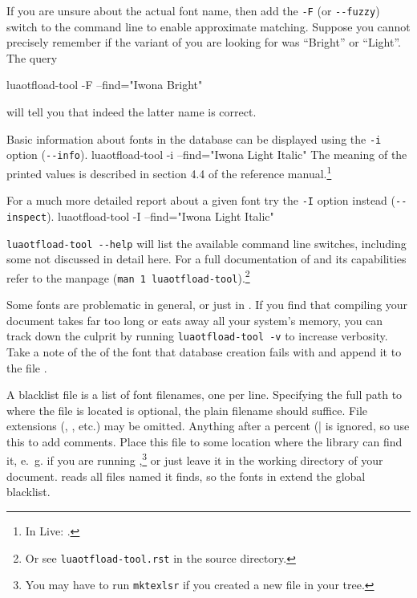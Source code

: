 If you are unsure about the actual font name, then add the
\verb|-F| (or \verb|--fuzzy|) switch to the command line to enable
approximate matching.
%
Suppose you cannot precisely remember if the variant of
 you are looking for was “Bright” or “Light”.
The query

\beginlisting
  luaotfload-tool  -F --find="Iwona Bright"
\endlisting

\noindent
will tell you that indeed the latter name is correct.

Basic information about fonts in the database can be displayed
using the \verb|-i| option (\verb|--info|).
%
\beginlisting
  luaotfload-tool  -i --find="Iwona Light Italic"
\endlisting
%
\noindent
The meaning of the printed values is described in section 4.4 of the
\LUATEX reference manual.\footnote{%
  In \TEX Live: .
}

For a much more detailed report about a given font try the \verb|-I| option
instead (\verb|--inspect|).
\beginlisting
  luaotfload-tool  -I --find="Iwona Light Italic"
\endlisting

\verb|luaotfload-tool --help| will list the available command line
switches, including some not discussed in detail here.
%
For a full documentation of  and its
capabilities refer to the manpage
(\verb|man 1 luaotfload-tool|).\footnote{%
  Or see \verb|luaotfload-tool.rst| in the source directory.
}

\endsubsection

\label{font-blacklist}

Some fonts are problematic in general, or just in \LUATEX.
%
If you find that compiling your document takes far too long or eats
away all your system’s memory, you can track down the culprit by
running \verb|luaotfload-tool -v| to increase verbosity.
%
Take a note of the  of the font that database
creation fails with and append it to the file
.

A blacklist file is a list of font filenames, one per line.
Specifying the full path to where the file is located is optional, the
plain filename should suffice.
%
File extensions (, , etc.) may be omitted.
%
Anything after a percent (|%
is ignored, so use this to add comments.
%
Place this file to some location where the 
library can find it, e.~g.
 if you are running
,\footnote{%
  You may have to run \verb|mktexlsr| if you created a new file in
  your  tree.
}
or just leave it in the working directory of your document.
%
 reads all files named
 it finds, so the fonts in
 extend the global blacklist.


